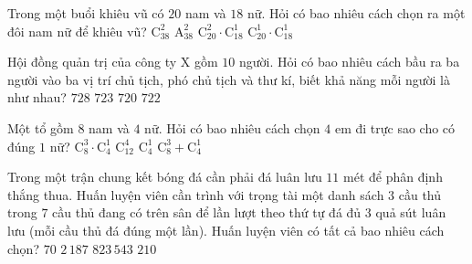 \begin{ex}%
	Trong một buổi  khiêu vũ có $20$ nam và $18$ nữ. Hỏi có bao nhiêu cách chọn ra một đôi nam nữ để khiêu vũ?
	 \choice
		 {$\mathrm{C}_{38}^{2}$}
		 {$\mathrm{A}_{38}^{2}$}
		{$\mathrm{C}_{20}^{2}\cdot \mathrm{C}_{18}^{1}$} 
		{\True  $\mathrm{C}_{20}^{1}\cdot \mathrm{C}_{18}^{1}$}
\end{ex}

\begin{ex}%
	Hội đồng quản trị của công ty X gồm $10$ người. Hỏi có bao nhiêu cách bầu  ra ba người vào ba vị trí chủ tịch, phó chủ tịch và thư kí, biết khả năng mỗi người là như nhau?
	\choice 
		 {$728$}
		{$723$} 
		{\True $720$} 
		 {$722$}
\end{ex}

\begin{ex}%
	Một tổ gồm $ 8 $ nam và $ 4 $ nữ. Hỏi có bao nhiêu cách chọn  $ 4 $ em đi trực sao cho có đúng $ 1 $ nữ?
	\choice 
		{\True $  \mathrm{C}_8^3\cdot \mathrm{C}_4^1 $}
		{\True $ \mathrm{C}_{12}^4  $}
		{$ \mathrm{C}_4^1 $} 
		{$ \mathrm{C}_8^3+\mathrm{C}_4^1  $}
\end{ex}

\begin{ex}%
	Trong một trận chung kết bóng đá cần phải đá luân lưu  $11$ mét để phân định thắng thua. Huấn luyện viên cần trình với trọng tài một danh sách $3$ cầu thủ trong $7$ cầu thủ đang có trên sân để lần lượt theo thứ tự đá đủ $3$ quả sút luân lưu (mỗi cầu thủ đá đúng một lần). Huấn luyện viên có tất cả bao nhiêu cách chọn?
	 \choice
		{$70$} 
		 {$2\,187$}
		 {$823\,543$}
		{\True $210$} 
\end{ex}

